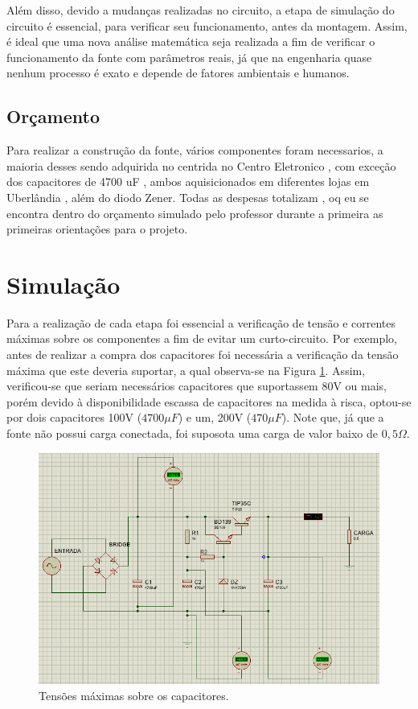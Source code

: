 \documentclass[a4paper,12pt,oneside,openany,table,xcdraw]{article}
\begin{document}
   Além disso, devido a mudanças realizadas no circuito, a etapa de simulação  do circuito é essencial, para verificar seu funcionamento, antes da montagem. Assim, é ideal que uma nova análise matemática seja realizada a fim de verificar o funcionamento da fonte com parâmetros reais, já que na engenharia quase nenhum processo é exato e depende de fatores ambientais e humanos.
 
\subsection{Orçamento}

Para realizar a construção da fonte, vários componentes foram necessarios, a maioria desses sendo adquirida no centrida no Centro  Eletronico , com exceção dos capacitores de 4700 uF , ambos aquisicionados em diferentes lojas em Uberlândia , além do diodo Zener.
Todas as despesas totalizam , oq eu se encontra dentro do orçamento simulado pelo professor durante a primeira  as primeiras orientações para o projeto.

\newpage
\section{Simulação}
Para a realização de cada etapa foi essencial a verificação de tensão e correntes máximas sobre os componentes a fim de evitar um curto-circuito.
Por exemplo, antes de realizar a compra dos capacitores foi necessária a verificação da tensão máxima que este deveria suportar, a qual observa-se na Figura \ref{sim2}. Assim, verificou-se que seriam necessários capacitores que suportassem 80V ou mais, porém devido à disponibilidade escassa de capacitores na medida à risca, optou-se por dois capacitores 100V ($4700\mu F$) e um, 200V ($470\mu F$). Note que, já que a fonte não possui carga conectada, foi suposota uma carga de valor baixo de $0,5 \Omega$.

\begin{figure}[H]
\centering
\captionsetup{font=scriptsize}
\includegraphics[width=16cm]{sim2}
\caption{Tensões máximas sobre os capacitores.}
\label{sim2}
\end{figure}
\end{document}
